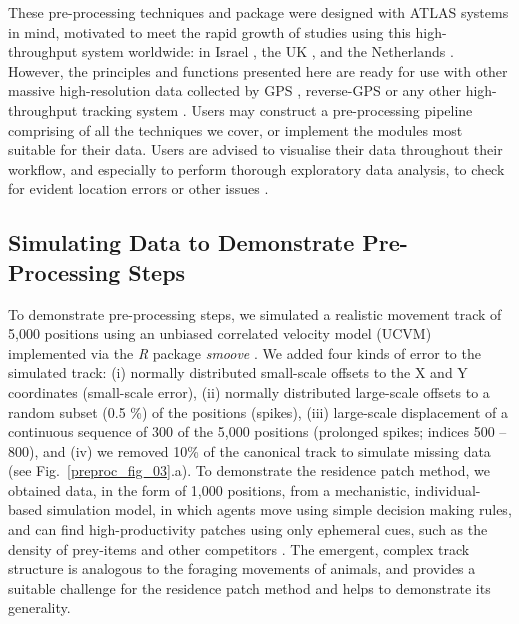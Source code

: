     These pre-processing techniques and package were designed with ATLAS systems in mind, motivated to meet the rapid growth of studies using this high-throughput system worldwide: in Israel \citep{toledo2014, toledo2016, toledo2020, corl2020, vilk2021}, the UK \citep{beardsworth2021a, beardsworth2021b}, and the Netherlands \citep[][]{beardsworth2022mee,bijleveld2021}. 
    However, the principles and functions presented here are ready for use with other massive high-resolution data collected by GPS \citep[e.g.][]{papageorgiou2019}, reverse-GPS \citep[e.g.][]{aspillaga2021} or any other high-throughput tracking system .
    Users may construct a pre-processing pipeline comprising of all the techniques we cover, or implement the modules most suitable for their data.
    Users are advised to visualise their data throughout their workflow, and especially to perform thorough exploratory data analysis, to check for evident location errors or other issues \citep{slingsby2016}.
    

    \subsection*{Simulating Data to Demonstrate Pre-Processing Steps}

    To demonstrate pre-processing steps, we simulated a realistic movement track of 5,000 positions using an unbiased correlated velocity model (UCVM) implemented via the \textit{R} package \textit{smoove} \citep[][see Fig.~\ref{preproc_fig_03}.a]{gurarie2017}.
    We added four kinds of error to the simulated track: (i) normally distributed small-scale offsets to the X and Y coordinates (small-scale error), (ii) normally distributed large-scale offsets to a random subset (0.5 \%) of the positions (spikes), (iii) large-scale displacement of a continuous sequence of 300 of the 5,000 positions (prolonged spikes; indices 500 -- 800), and (iv) we removed 10\% of the canonical track to simulate missing data (see Fig.~\ref{preproc_fig_03}.a).
    To demonstrate the residence patch method, we obtained data, in the form of 1,000 positions, from a mechanistic, individual-based simulation model, in which agents move using simple decision making rules, and can find high-productivity patches using only ephemeral cues, such as the density of prey-items and other competitors \citep{gupte2021a, netz2022a}.
    The emergent, complex track structure is analogous to the foraging movements of animals, and provides a suitable challenge for the residence patch method and helps to demonstrate its generality.


